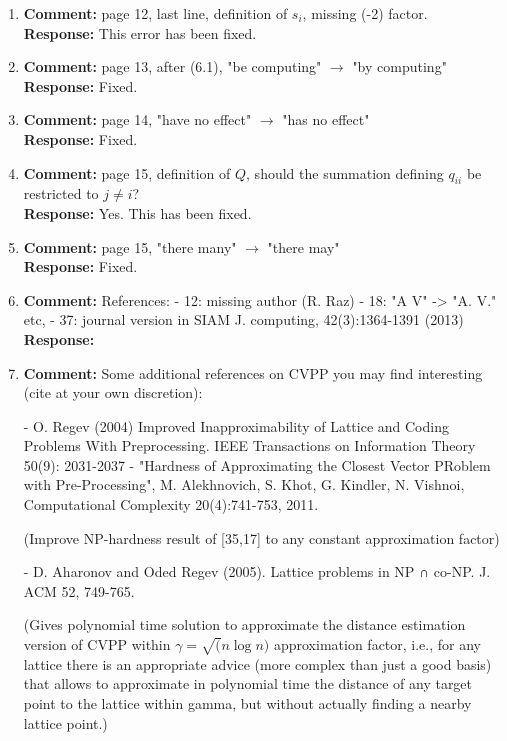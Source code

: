 \documentclass[a4paper,10pt]{article}
\begin{document}
\begin{enumerate}
\item\textbf{Comment:}  
page 12, last line, definition of $s_i$, missing (-2) factor. 
\\\textbf{Response:}
This error has been fixed.

\item\textbf{Comment:}  
page 13, after (6.1), "be computing" $\to$ "by computing" 
\\\textbf{Response:}
Fixed.

\item\textbf{Comment:}  
page 14, "have no effect" $\to$ "has no effect" 
\\\textbf{Response:}
Fixed.

\item\textbf{Comment:}  
page 15, definition of $Q$, should the summation defining $q_{ii}$ be restricted to $j\neq i$? 
\\\textbf{Response:}
Yes. This has been fixed.

\item\textbf{Comment:}  
page 15, "there many" $\to$ "there may" 
\\\textbf{Response:}
Fixed.

\item\textbf{Comment:}  
References: 
- 12: missing author (R. Raz) 
- 18: "A V" -> "A. V." etc, 
- 37: journal version in SIAM J. computing, 42(3):1364-1391 (2013) 
\\\textbf{Response:}

\item\textbf{Comment:}  
Some additional references on CVPP you may find interesting 
(cite at your own discretion): 

- O. Regev (2004) Improved Inapproximability of Lattice and Coding Problems With Preprocessing. IEEE Transactions on Information Theory 50(9): 2031-2037 
- "Hardness of Approximating the Closest Vector PRoblem with Pre-Processing", M. Alekhnovich, S. Khot, G. Kindler, N. Vishnoi, Computational Complexity 20(4):741-753, 2011. 

(Improve NP-hardness result of [35,17] to any constant approximation factor) 

- D. Aharonov and Oded Regev (2005). Lattice problems in NP ∩ co-NP. J. ACM 52, 749-765. 

(Gives polynomial time solution to approximate the distance estimation version of CVPP within $\gamma=\sqrt(n \log n)$ approximation factor, i.e., for any lattice there is an appropriate advice (more complex than just a good basis) that allows to approximate in polynomial time the distance of any target point to the lattice within gamma, but without actually finding a nearby lattice point.) 


\end{enumerate}
\end{document}
